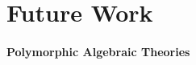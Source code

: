 
\section{Future Work} \label{sec:future}


\paragraph{Polymorphic Algebraic Theories}
\cite{Fiore2013,Hamana2011,Hamana2022}
